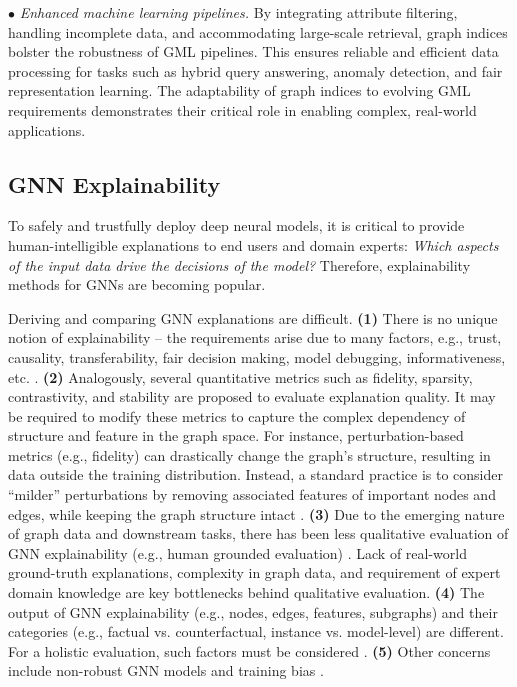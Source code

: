 \documentclass{sig-alternate-10pt}
\begin{document}
\noindent $\bullet$ {\em Enhanced machine learning pipelines.}
By integrating attribute filtering, handling incomplete data, and accommodating large-scale retrieval, graph indices bolster the robustness of GML pipelines. This ensures reliable and efficient data processing for tasks such as hybrid query answering, anomaly detection, and fair representation learning. The adaptability of graph indices to evolving GML requirements demonstrates their critical role in enabling complex, real-world applications.


\subsection{GNN Explainability}
\label{sec:explainability}

\medskip
\medskip

To safely and trustfully deploy deep neural models, it is critical to provide human-intelligible explanations to end users and domain experts: {\em Which aspects of the input data drive the decisions of the model?} Therefore, explainability methods for GNNs are becoming popular.

Deriving and comparing GNN explanations are difficult. {\bf (1)} There is no unique notion of explainability -- the requirements arise due to many factors, e.g., trust, causality, transferability, fair decision making,  model debugging, informativeness, etc. \cite{Lipton18,KimD21}. {\bf (2)} Analogously, several quantitative metrics
such as fidelity, sparsity, contrastivity, and stability are proposed to evaluate explanation quality. It may be required to modify these metrics to capture the complex dependency of structure and feature in the graph space. For instance,
perturbation-based metrics (e.g., fidelity) can drastically change the graph's structure, resulting in data outside the training distribution. Instead, a standard practice is to consider ``milder'' perturbations by removing associated features of important nodes and edges, while keeping the graph structure intact \cite{PKRMH18,yuan2022explainability}. {\bf (3)} Due to the emerging nature of graph data and downstream tasks, there has been less qualitative evaluation of GNN explainability (e.g., human grounded evaluation) \cite{VT20,abs-2206-13983}. Lack of real-world ground-truth explanations, complexity in graph data, and requirement of expert domain knowledge are key bottlenecks behind qualitative evaluation. {\bf (4)} The output of GNN explainability (e.g., nodes, edges, features, subgraphs) and their categories (e.g., factual vs. counterfactual, instance vs. model-level) are different. For a holistic evaluation, such factors must be considered \cite{KM23}. {\bf (5)} Other concerns include non-robust GNN models and training bias \cite{FMW21}.
\end{document}
